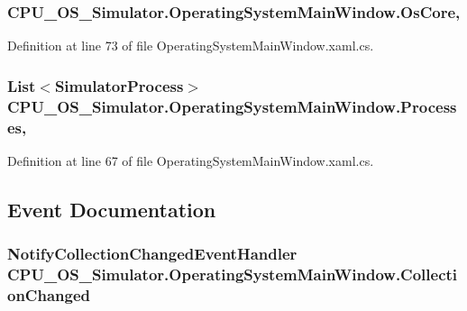 \subsubsection[{Os\+Core}]{ C\+P\+U\+\_\+\+O\+S\+\_\+\+Simulator.\+Operating\+System\+Main\+Window.\+Os\+Core\hspace{0.3cm}{\ttfamily [get]}, {\ttfamily [set]}}\label{class_c_p_u___o_s___simulator_1_1_operating_system_main_window_ad714e0ed6e880516f8afc3f1531a2d14}


Definition at line 73 of file Operating\+System\+Main\+Window.\+xaml.\+cs.

\hypertarget{class_c_p_u___o_s___simulator_1_1_operating_system_main_window_aadbbb1f580d767211e180a95ec71b849}{}
\subsubsection[{Processes}]{\setlength{\rightskip}{0pt plus 5cm}List$<${\bf Simulator\+Process}$>$ C\+P\+U\+\_\+\+O\+S\+\_\+\+Simulator.\+Operating\+System\+Main\+Window.\+Processes\hspace{0.3cm}{\ttfamily [get]}, {\ttfamily [set]}}\label{class_c_p_u___o_s___simulator_1_1_operating_system_main_window_aadbbb1f580d767211e180a95ec71b849}


Definition at line 67 of file Operating\+System\+Main\+Window.\+xaml.\+cs.



\subsection{Event Documentation}
\hypertarget{class_c_p_u___o_s___simulator_1_1_operating_system_main_window_af8aeaf0c83021caf8f735ea7c051848c}{}
\subsubsection[{Collection\+Changed}]{\setlength{\rightskip}{0pt plus 5cm}Notify\+Collection\+Changed\+Event\+Handler C\+P\+U\+\_\+\+O\+S\+\_\+\+Simulator.\+Operating\+System\+Main\+Window.\+Collection\+Changed}\label{class_c_p_u___o_s___simulator_1_1_operating_system_main_window_af8aeaf0c83021caf8f735ea7c051848c}


